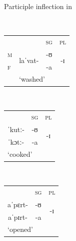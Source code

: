 \documentclass[output=paper,colorlinks,citecolor=brown]{langscibook}
\begin{document}
\bigskip

\noindent\begin{minipage}{\textwidth}
	\begin{exe}
		\ex \label{04ex21}
		Participle inflection in  \citep[167]{loporcaro2010-change}
		\setlength{\columnsep}{20pt}
		\begin{multicols}{3}
			\begin{xlist}
				\ex \label{04ex21a}\phantom{x} \vspace*{0.2cm} \\
				\hspace*{-0.8cm}\begin{tabularx}{\linewidth}{llll}
					& & \textsc{sg} & \textsc{pl} \\
					\cline{2-4}
					\textsc{m} & \multicolumn{1}{|c|}{\multirow{2}{*}{laˈvat-}} & \multicolumn{1}{c|}{-ʊ} & \multicolumn{1}{c|}{\multirow{2}{*}{-ɪ}} \\
					\cline{3-3}
					\textsc{f} & \multicolumn{1}{|c|}{} & \multicolumn{1}{c|}{-a} & \multicolumn{1}{c|}{} \\
					\cline{2-4}
					& \multicolumn{3}{l}{\rule{0pt}{0.5cm}‘washed’} \\
				\end{tabularx}
				
				\ex \label{04ex21b} \phantom{x} \vspace*{0.2cm} \\
				\hspace*{-0.3cm}\begin{tabularx}{\linewidth}{lll}
					& \textsc{sg} & \textsc{pl} \\
					\cline{1-3}
					\multicolumn{1}{|c|}{ˈkutː-} & \multicolumn{1}{c|}{-ʊ} & \multicolumn{1}{c|}{\multirow{2}{*}{-ɪ}} \\
					\cline{1-2}
					\multicolumn{1}{|c|}{ˈkɔtː-} & \multicolumn{1}{c|}{-a} & \multicolumn{1}{c|}{} \\
					\cline{1-3}
					\multicolumn{3}{l}{\rule{0pt}{0.5cm}‘cooked’} \\
				\end{tabularx}
				
				\ex \label{04ex21c} \phantom{x} \vspace*{0.2cm} \\
				\hspace*{-0.7cm}\begin{tabularx}{\linewidth}{lll}
					& \textsc{sg} & \textsc{pl} \\
					\cline{1-3}
					\multicolumn{1}{|c|}{aˈpɛrt-} & \multicolumn{1}{c|}{-ʊ} & \multicolumn{1}{c|}{\multirow{2}{*}{-ɪ}} \\
					\cline{1-2}
					\multicolumn{1}{|c|}{aˈpɪrt-} & \multicolumn{1}{c|}{-a} & \multicolumn{1}{c|}{} \\
					\cline{1-3}
					\multicolumn{3}{l}{\rule{0pt}{0.5cm}‘opened’} \\
				\end{tabularx}
			\end{xlist}
		\end{multicols}
		
	\end{exe}
\end{minipage}
\end{document}
